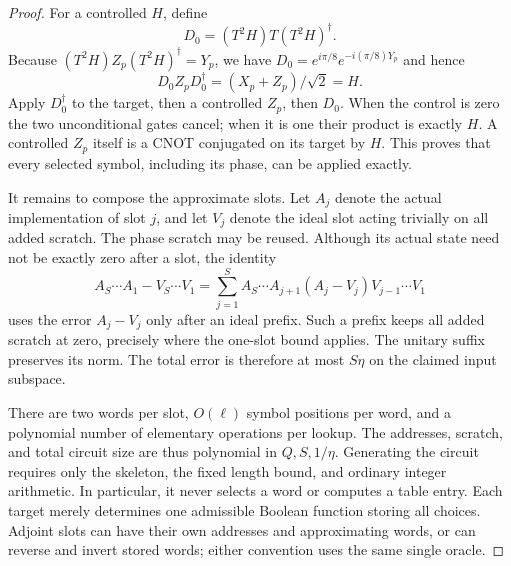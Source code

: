 \begin{proof}
For a controlled $H$, define
\[
 D_0=(T^2H)T(T^2H)^\dagger.
\]
Because $(T^2H)Z_p(T^2H)^\dagger=Y_p$, we have
$D_0=e^{i\pi/8}e^{-i(\pi/8)Y_p}$ and hence
\[
 D_0Z_pD_0^\dagger=(X_p+Z_p)/\sqrt2=H.
\]
Apply $D_0^\dagger$ to the target, then a controlled $Z_p$, then $D_0$.
When the control is zero the two unconditional gates cancel; when it is
one their product is exactly $H$. A controlled $Z_p$ itself is a CNOT
conjugated on its target by $H$. This proves that every selected symbol,
including its phase, can be applied exactly.

It remains to compose the approximate slots. Let $A_j$ denote the actual
implementation of slot $j$, and let $V_j$ denote the ideal slot acting
trivially on all added scratch. The phase scratch may be reused. Although
its actual state need not be exactly zero after a slot, the identity
\[
 A_S\cdots A_1-V_S\cdots V_1
 =\sum_{j=1}^S A_S\cdots A_{j+1}(A_j-V_j)V_{j-1}\cdots V_1
\]
uses the error $A_j-V_j$ only after an ideal prefix. Such a prefix keeps
all added scratch at zero, precisely where the one-slot bound applies.
The unitary suffix preserves its norm. The total error is therefore at
most $S\eta$ on the claimed input subspace.

There are two words per slot, $O(\ell)$ symbol positions per word, and a
polynomial number of elementary operations per lookup. The addresses,
scratch, and total circuit size are thus polynomial in $Q,S,1/\eta$.
Generating the circuit requires only the skeleton, the fixed length bound,
and ordinary integer arithmetic. In particular, it never selects a word
or computes a table entry. Each target merely determines one admissible
Boolean function storing all choices. Adjoint slots can have their own
addresses and approximating words, or can reverse and invert stored
words; either convention uses the same single oracle.
\end{proof}

